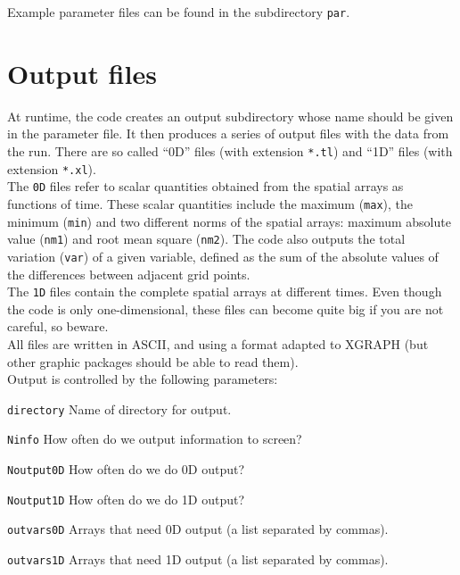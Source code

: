 \documentclass[12pt]{article}
\begin{document}
Example parameter files can be found in the subdirectory
\texttt{par}.\\



\section{Output files}

At runtime, the code creates an output subdirectory whose name should
be given in the parameter file.  It then produces a series of output
files with the data from the run.  There are so called ``0D'' files
(with extension \texttt{*.tl}) and ``1D'' files (with extension
\texttt{*.xl}). \\

The \texttt{0D} files refer to scalar quantities obtained from the
spatial arrays as functions of time.  These scalar quantities include
the maximum (\texttt{max}), the minimum (\texttt{min}) and two
different norms of the spatial arrays: maximum absolute value
(\texttt{nm1}) and root mean square (\texttt{nm2}).  The code also
outputs the total variation (\texttt{var}) of a given variable,
defined as the sum of the absolute values of the differences between
adjacent grid points. \\

The \texttt{1D} files contain the complete spatial arrays at different
times.  Even though the code is only one-dimensional, these files can
become quite big if you are not careful, so beware. \\

All files are written in ASCII, and using a format adapted to XGRAPH
(but other graphic packages should be able to read them).\\

Output is controlled by the following parameters:

\begin{list}{}{
\setlength{\leftmargin}{35mm}
\setlength{\labelsep}{10mm}
\setlength{\labelwidth}{20mm}}

\item[\texttt{directory}] Name of directory for output.

\item[\texttt{Ninfo}] How often do we output information to screen?

\item[\texttt{Noutput0D}] How often do we do 0D output?

\item[\texttt{Noutput1D}] How often do we do 1D output?

\item[\texttt{outvars0D}] Arrays that need 0D output (a list separated by commas).

\item[\texttt{outvars1D}] Arrays that need 1D output (a list separated by commas).

\end{list}
\end{document}
